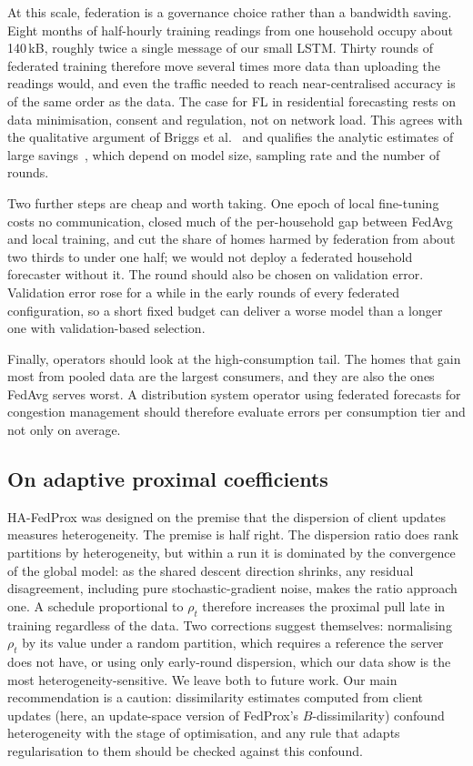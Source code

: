 At this scale, federation is a governance choice rather than a bandwidth saving. Eight months of half-hourly training
readings from one household occupy about 140\,kB, roughly twice a single message of our small LSTM. Thirty rounds of
federated training therefore move several times more data than uploading the readings would, and even the traffic
needed to reach near-centralised accuracy is of the same order as the data. The case for FL in residential
forecasting rests on data minimisation, consent and regulation, not on network load. This agrees with the
qualitative argument of Briggs et al.~\cite{briggs2020ccai} and qualifies the analytic estimates of large
savings~\cite{taik2020,savi2021}, which depend on model size, sampling rate and the number of rounds.

Two further steps are cheap and worth taking. One epoch of local fine-tuning costs no communication, closed much of
the per-household gap between FedAvg and local training, and cut the share of homes harmed by federation from about
two thirds to under one half; we would not deploy a federated household forecaster without it. The round should also
be chosen on validation error. Validation error rose for a while in the early rounds of every federated
configuration, so a short fixed budget can deliver a worse model than a longer one with validation-based selection.

Finally, operators should look at the high-consumption tail. The homes that gain most from pooled data are the
largest consumers, and they are also the ones FedAvg serves worst. A distribution system operator using federated
forecasts for congestion management should therefore evaluate errors per consumption tier and not only on average.

\subsection{On adaptive proximal coefficients}
HA-FedProx was designed on the premise that the dispersion of client updates measures heterogeneity. The premise is
half right. The dispersion ratio does rank partitions by heterogeneity, but within a run it is dominated by the
convergence of the global model: as the shared descent direction shrinks, any residual disagreement, including pure
stochastic-gradient noise, makes the ratio approach one. A schedule proportional to $\rho_t$ therefore increases the
proximal pull late in training regardless of the data. Two corrections suggest themselves: normalising $\rho_t$ by
its value under a random partition, which requires a reference the server does not have, or using only early-round
dispersion, which our data show is the most heterogeneity-sensitive. We leave both to future work. Our main
recommendation is a caution: dissimilarity estimates computed from client updates (here, an update-space version of
FedProx's $B$-dissimilarity) confound heterogeneity with the stage of optimisation, and any rule that adapts
regularisation to them should be checked against this confound.

